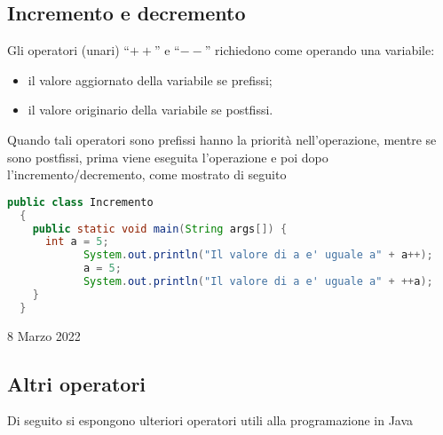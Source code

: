 \documentclass[a4paper]{extarticle}
\newcommand{\quotes}[1]{``#1''}
\begin{document}
\vspace{1em}
\subsection{Incremento e decremento}
Gli operatori (unari) \quotes{$++$} e \quotes{$--$} richiedono come operando una variabile:
\begin{itemize}
  \item il valore aggiornato della variabile se prefissi;
  \item il valore originario della variabile se postfissi.
\end{itemize}
Quando tali operatori sono prefissi hanno la priorità nell'operazione, mentre se sono postfissi, prima viene eseguita l'operazione e poi dopo l'incremento/decremento, come mostrato di seguito

\vspace{1em}
\noindent
\begin{lstlisting}[language=Java, caption=Incremento in Java]
  public class Incremento
  {
    public static void main(String args[]) {
      int a = 5;
			System.out.println("Il valore di a e' uguale a" + a++);
			a = 5;
			System.out.println("Il valore di a e' uguale a" + ++a);
    }
  }
\end{lstlisting}
\vspace{1em}

\newpage
\noindent
\begin{center}
  8 Marzo 2022
\end{center}

\subsection{Altri operatori}
Di seguito si espongono ulteriori operatori utili alla programazione in Java
\end{document}
